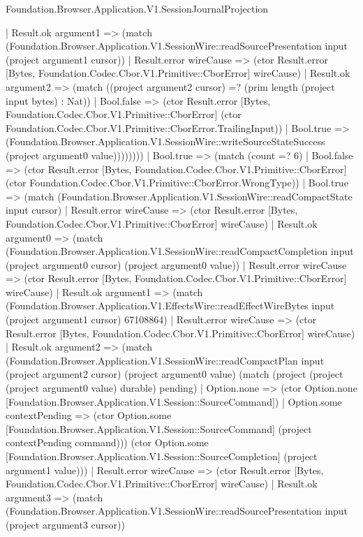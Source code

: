 \begin{lexlean}{Foundation.Browser.Application.V1.SessionJournalProjection}
\begin{semanticmodule}
{                    | Result.ok argument1 => (match (Foundation.Browser.Application.V1.SessionWire::readSourcePresentation input (project argument1 cursor))
                      | Result.error wireCause => (ctor Result.error [Bytes, Foundation.Codec.Cbor.V1.Primitive::CborError] wireCause)
                      | Result.ok argument2 => (match ((project argument2 cursor) =? (prim length (project input bytes) : Nat))
                        | Bool.false => (ctor Result.error [Bytes, Foundation.Codec.Cbor.V1.Primitive::CborError] (ctor Foundation.Codec.Cbor.V1.Primitive::CborError.TrailingInput))
                        | Bool.true => (Foundation.Browser.Application.V1.SessionWire::writeSourceStateSuccess (project argument0 value))))))))
            | Bool.true => (match (count =? 6)
              | Bool.false => (ctor Result.error [Bytes, Foundation.Codec.Cbor.V1.Primitive::CborError] (ctor Foundation.Codec.Cbor.V1.Primitive::CborError.WrongType))
              | Bool.true => (match (Foundation.Browser.Application.V1.SessionWire::readCompactState input cursor)
                | Result.error wireCause => (ctor Result.error [Bytes, Foundation.Codec.Cbor.V1.Primitive::CborError] wireCause)
                | Result.ok argument0 => (match (Foundation.Browser.Application.V1.SessionWire::readCompactCompletion input (project argument0 cursor) (project argument0 value))
                  | Result.error wireCause => (ctor Result.error [Bytes, Foundation.Codec.Cbor.V1.Primitive::CborError] wireCause)
                  | Result.ok argument1 => (match (Foundation.Browser.Application.V1.EffectsWire::readEffectWireBytes input (project argument1 cursor) 67108864)
                    | Result.error wireCause => (ctor Result.error [Bytes, Foundation.Codec.Cbor.V1.Primitive::CborError] wireCause)
                    | Result.ok argument2 => (match (Foundation.Browser.Application.V1.SessionWire::readCompactPlan input (project argument2 cursor) (project argument0 value) (match (project (project (project argument0 value) durable) pending)
                        | Option.none => (ctor Option.none [Foundation.Browser.Application.V1.Session::SourceCommand])
                        | Option.some contextPending => (ctor Option.some [Foundation.Browser.Application.V1.Session::SourceCommand] (project contextPending command))) (ctor Option.some [Foundation.Browser.Application.V1.Session::SourceCompletion] (project argument1 value)))
                      | Result.error wireCause => (ctor Result.error [Bytes, Foundation.Codec.Cbor.V1.Primitive::CborError] wireCause)
                      | Result.ok argument3 => (match (Foundation.Browser.Application.V1.SessionWire::readSourcePresentation input (project argument3 cursor))
}
\end{semanticmodule}
\end{lexlean}
